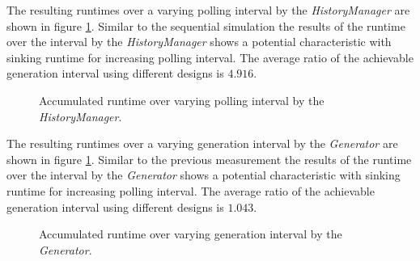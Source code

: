 The resulting runtimes over a varying polling interval by the \emph{HistoryManager} are shown in figure \ref{fig:results_parallel_runtime_polling}.
Similar to the sequential simulation the results of the runtime over the interval by the \emph{HistoryManager} shows a potential characteristic with sinking runtime for increasing polling interval.
The average ratio of the achievable generation interval using different designs is $4.916$.
\\

\begin{figure}
    \centering
    \caption{Accumulated runtime over varying polling interval by the \emph{HistoryManager}.}
    \label{fig:results_parallel_runtime_polling}
\end{figure}

The resulting runtimes over a varying generation interval by the \emph{Generator} are shown in figure \ref{fig:results_parallel_runtime_polling}.
Similar to the previous measurement the results of the runtime over the interval by the \emph{Generator} shows a potential characteristic with sinking runtime for increasing polling interval.
The average ratio of the achievable generation interval using different designs is $1.043$.
\\

\begin{figure}
    \centering
    \caption{Accumulated runtime over varying generation interval by the \emph{Generator}.}
    \label{fig:results_parallel_runtime_generation}
\end{figure}

